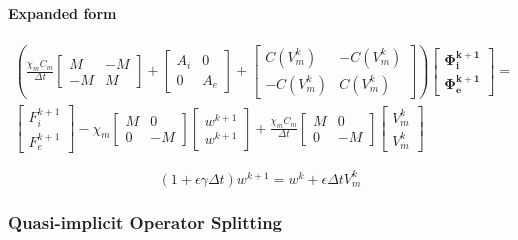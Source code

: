 \documentclass[a4paper]{article}
\begin{document}
\paragraph{Expanded form}
\begin{equation}
\begin{gathered}
\left( \frac{\chi_m C_m}{\Delta t} \begin{bmatrix} M & -M \\ -M & M \end{bmatrix} + \begin{bmatrix} A_i & 0 \\ 0 & A_e \end{bmatrix} + 
\begin{bmatrix}
C(V_m^k) & -C(V_m^k) \\ -C(V_m^k) & C(V_m^k)
\end{bmatrix}\right)
\begin{bmatrix} \bm{\Phi_i^{k+1}} \\ \bm{\Phi_e^{k+1}} \end{bmatrix} = 
\\
\begin{bmatrix} F_i^{k+1} \\ F_e^{k+1} \end{bmatrix} 
- \chi_m \begin{bmatrix}M & 0 \\ 0 & -M \end{bmatrix}
\begin{bmatrix} w^{k+1} \\ w^{k+1} \end{bmatrix}
+ \frac{\chi_m C_m}{\Delta t} \begin{bmatrix}M & 0 \\ 0 & -M\end{bmatrix}
\begin{bmatrix} V_m^{k} \\ V_m^{k} \end{bmatrix}
\end{gathered}
\end{equation}

\vspace{5mm}
\begin{equation}
(1+\epsilon \gamma \Delta t)w^{k+1} = w^k + \epsilon \Delta t V_m^k
\end{equation}

\newpage
\subsubsection{Quasi-implicit Operator Splitting}
\end{document}

